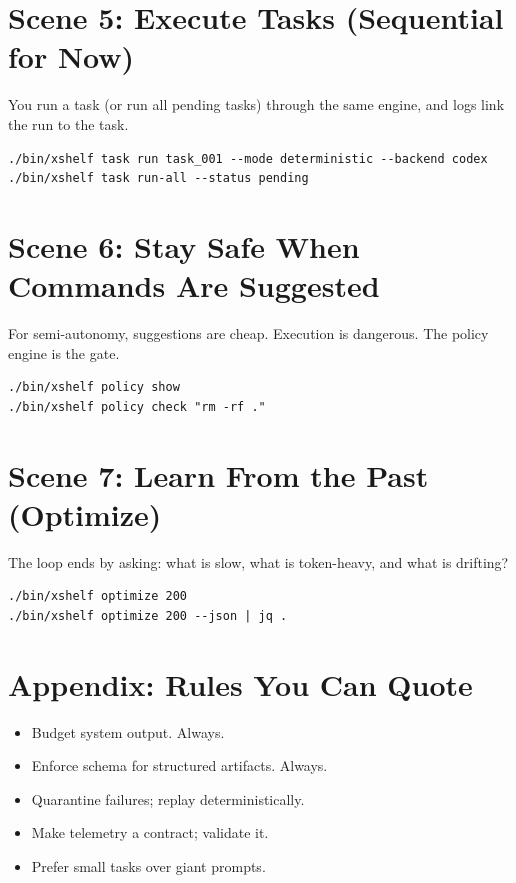 \documentclass[11pt]{article}
\begin{document}
\section{Scene 5: Execute Tasks (Sequential for Now)}
You run a task (or run all pending tasks) through the same engine, and logs link the run to the task.

\begin{lstlisting}[style=cx]
./bin/xshelf task run task_001 --mode deterministic --backend codex
./bin/xshelf task run-all --status pending
\end{lstlisting}

\section{Scene 6: Stay Safe When Commands Are Suggested}
For semi-autonomy, suggestions are cheap. Execution is dangerous. The policy engine is the gate.

\begin{lstlisting}[style=cx]
./bin/xshelf policy show
./bin/xshelf policy check "rm -rf ."
\end{lstlisting}

\section{Scene 7: Learn From the Past (Optimize)}
The loop ends by asking: what is slow, what is token-heavy, and what is drifting?

\begin{lstlisting}[style=cx]
./bin/xshelf optimize 200
./bin/xshelf optimize 200 --json | jq .
\end{lstlisting}

\section{Appendix: Rules You Can Quote}
\begin{itemize}
  \item Budget system output. Always.
  \item Enforce schema for structured artifacts. Always.
  \item Quarantine failures; replay deterministically.
  \item Make telemetry a contract; validate it.
  \item Prefer small tasks over giant prompts.
\end{itemize}
\end{document}
